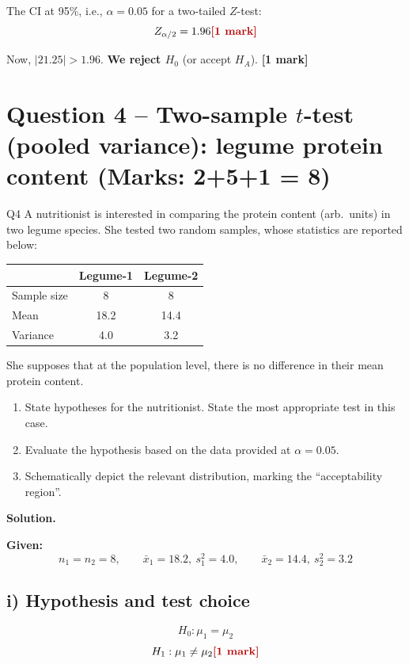 \documentclass[11pt]{article}
\newcommand{\soln}{\par\noindent\textcolor{acolor}{\textbf{Solution.}}\quad}
\newcommand{\mk}[1]{\hfill\textcolor{markcolor}{\textbf{[#1]}}}
\begin{document}
The CI at 95\%, i.e., $\alpha=0.05$ for a two-tailed $Z$-test:
\[
Z_{\alpha/2} = 1.96 \mk{1 mark}
\]

Now, $|21.25| > 1.96$. \textbf{We reject $H_0$} (or accept $H_A$). \mk{1 mark}

\section{Question 4 -- Two-sample $t$-test (pooled variance): legume protein content (Marks: 2+5+1 = 8)}
\begin{question}{Q4}
A nutritionist is interested in comparing the protein content (arb.\ units) in two legume species. She tested two random samples, whose statistics are reported below:

\begin{center}
\begin{tabular}{lcc}
\toprule
 & Legume-1 & Legume-2 \\
\midrule
Sample size & 8 & 8 \\
Mean & 18.2 & 14.4 \\
Variance & 4.0 & 3.2 \\
\bottomrule
\end{tabular}
\end{center}

She supposes that at the population level, there is no difference in their mean protein content.
\begin{enumerate}[label=\roman*)]
\item State hypotheses for the nutritionist. State the most appropriate test in this case.
\item Evaluate the hypothesis based on the data provided at $\alpha=0.05$.
\item Schematically depict the relevant distribution, marking the ``acceptability region''.
\end{enumerate}
\end{question}

\soln

\textbf{Given:}
\[
n_1=n_2=8, \qquad \bar{x}_1=18.2,\ s_1^2=4.0, \qquad \bar{x}_2=14.4,\ s_2^2=3.2
\]

\subsection*{i) Hypothesis and test choice}
\[
H_0: \mu_1=\mu_2
\]
\[
H_1: \mu_1\neq\mu_2 \mk{1 mark}
\]
\end{document}
